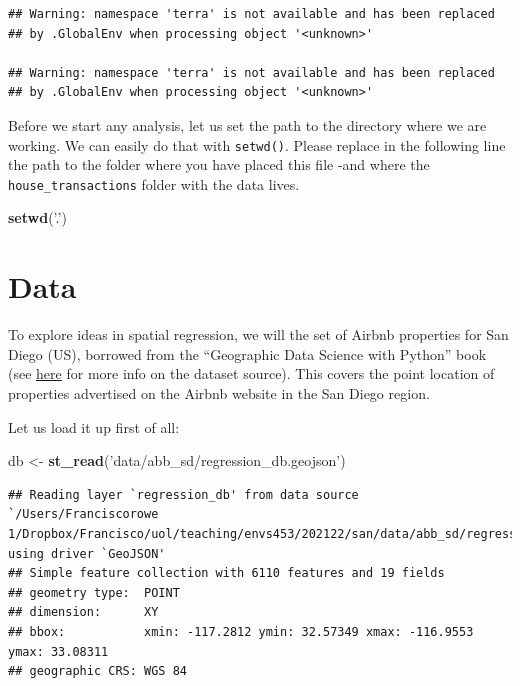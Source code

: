 \documentclass[
]{book}
\newenvironment{Shaded}{\begin{snugshade}}{\end{snugshade}}
\newcommand{\KeywordTok}[1]{\textcolor[rgb]{0.13,0.29,0.53}{\textbf{#1}}}
\newcommand{\NormalTok}[1]{#1}
\newcommand{\StringTok}[1]{\textcolor[rgb]{0.31,0.60,0.02}{#1}}
\begin{document}
\begin{verbatim}
## Warning: namespace 'terra' is not available and has been replaced
## by .GlobalEnv when processing object '<unknown>'

## Warning: namespace 'terra' is not available and has been replaced
## by .GlobalEnv when processing object '<unknown>'
\end{verbatim}

Before we start any analysis, let us set the path to the directory where we are working. We can easily do that with \texttt{setwd()}. Please replace in the following line the path to the folder where you have placed this file -and where the \texttt{house\_transactions} folder with the data lives.

\begin{Shaded}
\begin{Highlighting}[]
\KeywordTok{setwd}\NormalTok{(}\StringTok{'.'}\NormalTok{)}
\end{Highlighting}
\end{Shaded}

\hypertarget{data-2}{%
\section{Data}\label{data-2}}

To explore ideas in spatial regression, we will the set of Airbnb properties for San Diego (US), borrowed from the ``Geographic Data Science with Python'' book (see \href{https://geographicdata.science/book/data/airbnb/regression_cleaning.html}{here} for more info on the dataset source). This covers the point location of properties advertised on the Airbnb website in the San Diego region.

Let us load it up first of all:

\begin{Shaded}
\begin{Highlighting}[]
\NormalTok{db <-}\StringTok{ }\KeywordTok{st_read}\NormalTok{(}\StringTok{'data/abb_sd/regression_db.geojson'}\NormalTok{)}
\end{Highlighting}
\end{Shaded}

\begin{verbatim}
## Reading layer `regression_db' from data source `/Users/Franciscorowe 1/Dropbox/Francisco/uol/teaching/envs453/202122/san/data/abb_sd/regression_db.geojson' using driver `GeoJSON'
## Simple feature collection with 6110 features and 19 fields
## geometry type:  POINT
## dimension:      XY
## bbox:           xmin: -117.2812 ymin: 32.57349 xmax: -116.9553 ymax: 33.08311
## geographic CRS: WGS 84
\end{verbatim}
\end{document}
